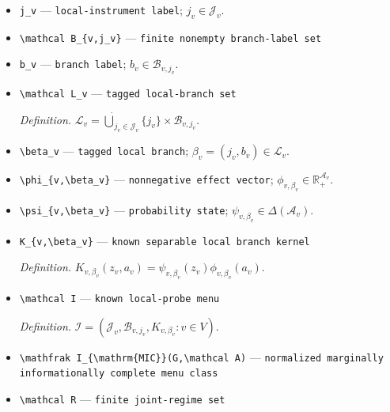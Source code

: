 \documentclass{article}
\begin{document}
\begin{itemize}
  \item \texttt{j\_\allowbreak{}v} --- \texttt{local-\allowbreak{}instrument label}; \(j_v\in\mathcal J_v\).
  \item \texttt{\textbackslash{}\allowbreak{}mathcal B\_\allowbreak{}\{v,\allowbreak{}j\_\allowbreak{}v\}\allowbreak{}} --- \texttt{finite nonempty branch-\allowbreak{}label set}
  \item \texttt{b\_\allowbreak{}v} --- \texttt{branch label}; \(b_v\in\mathcal B_{v,j_v}\).
  \item \texttt{\textbackslash{}\allowbreak{}mathcal L\_\allowbreak{}v} --- \texttt{tagged local-\allowbreak{}branch set}
  \par\smallskip\noindent\emph{Definition.} \(\mathcal L_v=\mathbin{\dot\bigcup}_{j_v\in\mathcal J_v}\{j_v\}\times\mathcal B_{v,j_v}\).
  \item \texttt{\textbackslash{}\allowbreak{}beta\_\allowbreak{}v} --- \texttt{tagged local branch}; \(\beta_v=(j_v,b_v)\in\mathcal L_v\).
  \item \texttt{\textbackslash{}\allowbreak{}phi\_\allowbreak{}\{v,\allowbreak{}\textbackslash{}\allowbreak{}beta\_\allowbreak{}v\}\allowbreak{}} --- \texttt{nonnegative effect vector}; \(\phi_{v,\beta_v}\in\mathbb R_+^{\mathcal A_v}\).
  \item \texttt{\textbackslash{}\allowbreak{}psi\_\allowbreak{}\{v,\allowbreak{}\textbackslash{}\allowbreak{}beta\_\allowbreak{}v\}\allowbreak{}} --- \texttt{probability state}; \(\psi_{v,\beta_v}\in\Delta(\mathcal A_v)\).
  \item \texttt{K\_\allowbreak{}\{v,\allowbreak{}\textbackslash{}\allowbreak{}beta\_\allowbreak{}v\}\allowbreak{}} --- \texttt{known separable local branch kernel}
  \par\smallskip\noindent\emph{Definition.} \(K_{v,\beta_v}(z_v,a_v)=\psi_{v,\beta_v}(z_v)\phi_{v,\beta_v}(a_v)\).
  \item \texttt{\textbackslash{}\allowbreak{}mathcal I} --- \texttt{known local-\allowbreak{}probe menu}
  \par\smallskip\noindent\emph{Definition.} \(\mathcal I=(\mathcal J_v,\mathcal B_{v,j_v},K_{v,\beta_v}:v\in V)\).
  \item \texttt{\textbackslash{}\allowbreak{}mathfrak I\_\allowbreak{}\{\textbackslash{}\allowbreak{}mathrm\{MIC\}\allowbreak{}\}\allowbreak{}(G,\allowbreak{}\textbackslash{}\allowbreak{}mathcal A)} --- \texttt{normalized marginally informationally complete menu class}
  \item \texttt{\textbackslash{}\allowbreak{}mathcal R} --- \texttt{finite joint-\allowbreak{}regime set}

\end{itemize}
\end{document}
